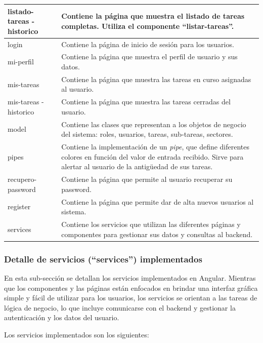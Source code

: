 \begin{table}[h]
\begin{tabular}{p{2.3cm} p{10.7cm}}
\hline
listado-tareas
-historico & Contiene la página que muestra el listado de tareas completas. Utiliza el componente ``listar-tareas''. \\
\hline
login & Contiene la página de inicio de sesión para los usuarios. \\
\hline
mi-perfil & Contiene la página que muestra el perfil de usuario y sus datos. \\
\hline
mis-tareas & Contiene la página que muestra las tareas en curso asignadas al usuario. \\
\hline
mis-tareas
-historico & Contiene la página que muestra las tareas cerradas del usuario. \\
\hline
model & Contiene las clases que representan a los objetos de negocio del sistema: roles, usuarios, tareas, sub-tareas, sectores. \\
\hline
pipes & Contiene la implementación de un \textit{pipe}, que define diferentes colores en función del valor de entrada recibido. Sirve para alertar al usuario de la antigüedad de sus tareas. \\
\hline
recupero-password & Contiene la página que permite al usuario recuperar su password. \\
\hline
register & Contiene la página que permite dar de alta nuevos usuarios al sistema. \\
\hline
services & Contiene los servicios que utilizan las diferentes páginas y componentes para gestionar sus datos y consultas al backend. \\
		\bottomrule
		\hline
	\end{tabular}
	\label{tab:carpetasFrontend}
\end{table}

\clearpage
\subsubsection{Detalle de servicios (``services'') implementados}
En esta sub-sección se detallan los servicios implementados en Angular. Mientras que los componentes y las páginas están enfocados en brindar una interfaz gráfica simple y fácil de utilizar para los usuarios, los servicios se orientan a las tareas de lógica de negocio, lo que incluye comunicarse con el backend y gestionar la autenticación y los datos del usuario.

Los servicios implementados son los siguientes:

